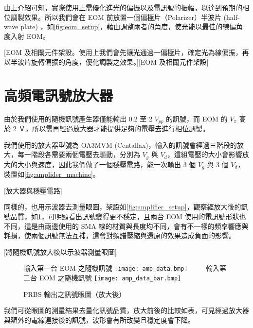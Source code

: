 \documentclass[class=NCU_thesis, crop=false]{standalone}
\begin{document}
由上介紹可知，實際使用上需優化進光的偏振以及電訊號的振幅，以達到預期的相位調製效果。所以我們會在 EOM 前放置一個偏極片（Polarizer）半波片 (half-wave plate) ，如\cref{fig:eom_setup}，藉由調整兩者的角度，使光能以最佳的線偏角度入射 EOM。

[EOM 及相關元件架設。使用上我們會先讓光通過一偏極片，確定光為線偏振，再以半波片旋轉偏振的角度，優化調製之效果。][EOM 及相關元件架設]

\section{高頻電訊號放大器}

由於我們使用的隨機訊號產生器僅能輸出 0.2 至 2 $V_{pp}$ 的訊號，而 EOM 的 $V_{\pi}$ 高於 2 Ｖ，所以需再經過放大器才能提供足夠的電壓去進行相位調製。

我們使用的放大器型號為 OA3MVM (Centallax)，輸入的訊號會經過三階段的放大，每一階段各需要兩個電壓去驅動，分別為 $V_{g}$ 與 $V_{d}$，這組電壓的大小會影響放大的大小與速度，因此我們做了一個穩壓電路，能一次輸出 3 個 $V_{g}$ 與 3 個 $V_{d}$，裝置如\cref{fig:amplider_machine}。

[放大器與穩壓電路]

同樣的，也用示波器去測量眼圖，架設如\cref{fig:amplifier_setup}，觀察經放大後的訊號品質，如\cref{fig:amp_prbs_eye}，可明顯看出訊號變得更不穩定，且兩台 EOM 使用的電訊號形狀也不同，這是由兩邊使用的 SMA 線的材質與長度均不同，會有不一樣的頻率響應與耗損，使兩個訊號無法互補，這會對頻譜壓縮與還原的效果造成負面的影響。

[將隨機訊號放大後以示波器測量眼圖]

\begin{figure}[!hbt]
    \centering
    \subcaptionbox
        {輸入第一台 EOM 之隨機訊號
        \label{fig:subfig_fig1}}
        {\texttt{[image: amp\_data.bmp]}}
    ~~~~
    \subcaptionbox
        {輸入第二台 EOM 之隨機訊號
        \label{fig:subfig_fig2}}
        {\texttt{[image: amp\_data\_bar.bmp]}}
    \caption{PRBS 輸出之訊號眼圖（放大後）}
    \label{fig:amp_prbs_eye}
\end{figure}

我們可從眼圖的測量結果去量化訊號品質，放大前後的比較如表，可見經過放大器與額外的電線連接後的訊號，波形會有所改變且穩定度會下降。
\end{document}
